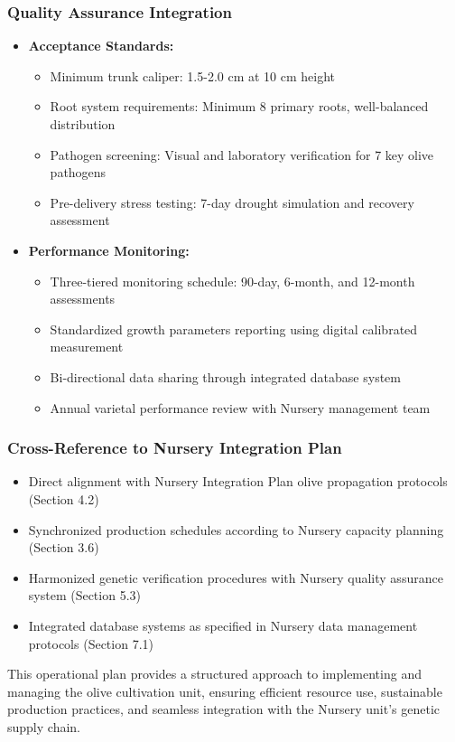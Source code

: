 \subsubsection{Quality Assurance Integration}
\begin{itemize}
    \item \textbf{Acceptance Standards:}
    \begin{itemize}
        \item Minimum trunk caliper: 1.5-2.0 cm at 10 cm height
        \item Root system requirements: Minimum 8 primary roots, well-balanced distribution
        \item Pathogen screening: Visual and laboratory verification for 7 key olive pathogens
        \item Pre-delivery stress testing: 7-day drought simulation and recovery assessment
    \end{itemize}
    \item \textbf{Performance Monitoring:}
    \begin{itemize}
        \item Three-tiered monitoring schedule: 90-day, 6-month, and 12-month assessments
        \item Standardized growth parameters reporting using digital calibrated measurement
        \item Bi-directional data sharing through integrated database system
        \item Annual varietal performance review with Nursery management team
    \end{itemize}
\end{itemize}

\subsubsection{Cross-Reference to Nursery Integration Plan}
\begin{itemize}
    \item Direct alignment with Nursery Integration Plan olive propagation protocols (Section 4.2)
    \item Synchronized production schedules according to Nursery capacity planning (Section 3.6)
    \item Harmonized genetic verification procedures with Nursery quality assurance system (Section 5.3)
    \item Integrated database systems as specified in Nursery data management protocols (Section 7.1)
\end{itemize}

This operational plan provides a structured approach to implementing and managing the olive cultivation unit, ensuring efficient resource use, sustainable production practices, and seamless integration with the Nursery unit's genetic supply chain.
